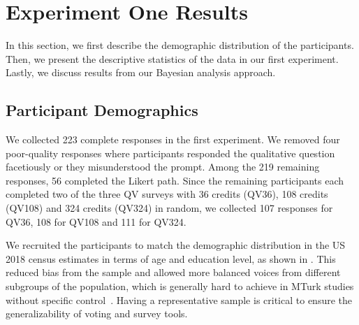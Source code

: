 \section{Experiment One Results} \label{results-1-quan}
In this section, we first describe the demographic distribution of the participants. Then, we present the descriptive statistics of the data in our first experiment. Lastly, we discuss results from our Bayesian analysis approach.

\subsection{Participant Demographics}
We collected 223 complete responses in the first experiment.  We removed four poor-quality responses where participants responded the qualitative question facetiously or they misunderstood the prompt. Among the 219 remaining responses, 56 completed the Likert path. Since the remaining participants each completed two of the three QV surveys with 36 credits (QV36), 108 credits (QV108) and 324 credits (QV324) in random, we collected 107 responses for QV36, 108 for QV108 and 111 for QV324. 
{}

We recruited the participants to match the demographic distribution in the US 2018 census estimates in terms of age and education level, as shown in . This reduced bias from the sample and allowed more balanced voices from different subgroups of the population, which is generally hard to achieve in MTurk studies without specific control~\cite{difallah2018demographics}. Having a representative sample is critical to ensure the generalizability of voting and survey tools. 

